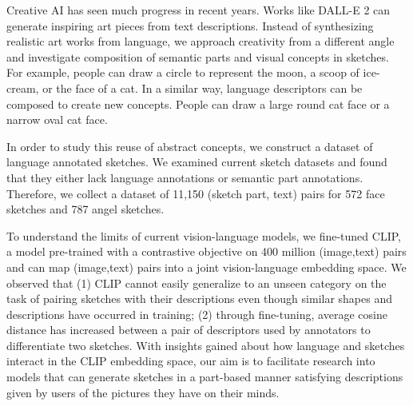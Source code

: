 Creative AI has seen much progress in recent years. Works like DALL-E 2 can generate inspiring art pieces from text descriptions. Instead of synthesizing realistic art works from language, we approach creativity from a different angle and investigate composition of semantic parts and visual concepts in sketches. For example, people can draw a circle to represent the moon, a scoop of ice-cream, or the face of a cat. In a similar way, language descriptors can be composed to create new concepts. People can draw a large round cat face or a narrow oval cat face. 


In order to study this reuse of abstract concepts, we construct a dataset of language annotated sketches.  We examined current sketch datasets and found that they either lack language annotations or semantic part annotations. Therefore, we collect a dataset of 11,150 (sketch part, text) pairs for 572 face sketches and 787 angel sketches. 


To understand the limits of current vision-language models, we fine-tuned CLIP,  a model pre-trained with a contrastive objective on 400 million (image,text) pairs and can map (image,text) pairs into a joint vision-language embedding space. We observed that (1) CLIP cannot easily generalize to an unseen category on the task of pairing sketches with their descriptions even though similar shapes and descriptions have occurred in training; (2) through fine-tuning, average cosine distance has increased between a pair of descriptors used by annotators to differentiate two sketches. With insights gained about how language and sketches interact in the CLIP embedding space, our aim is to facilitate research into models that can generate sketches in a part-based manner satisfying descriptions given by users of the pictures they have on their minds. 